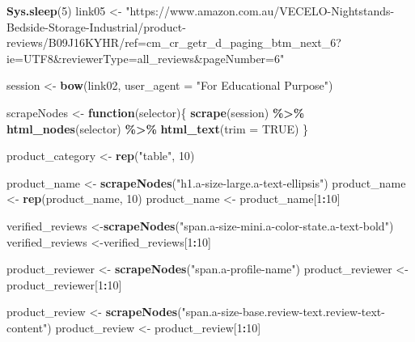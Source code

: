 \documentclass[
]{article}
\newenvironment{Shaded}{\begin{snugshade}}{\end{snugshade}}
\newcommand{\AttributeTok}[1]{\textcolor[rgb]{0.13,0.29,0.53}{#1}}
\newcommand{\ConstantTok}[1]{\textcolor[rgb]{0.56,0.35,0.01}{#1}}
\newcommand{\ControlFlowTok}[1]{\textcolor[rgb]{0.13,0.29,0.53}{\textbf{#1}}}
\newcommand{\DecValTok}[1]{\textcolor[rgb]{0.00,0.00,0.81}{#1}}
\newcommand{\FunctionTok}[1]{\textcolor[rgb]{0.13,0.29,0.53}{\textbf{#1}}}
\newcommand{\NormalTok}[1]{#1}
\newcommand{\OtherTok}[1]{\textcolor[rgb]{0.56,0.35,0.01}{#1}}
\newcommand{\SpecialCharTok}[1]{\textcolor[rgb]{0.81,0.36,0.00}{\textbf{#1}}}
\newcommand{\StringTok}[1]{\textcolor[rgb]{0.31,0.60,0.02}{#1}}
\begin{document}
\begin{Shaded}
\begin{Highlighting}[]
   \FunctionTok{Sys.sleep}\NormalTok{(}\DecValTok{5}\NormalTok{)}
\NormalTok{link05 }\OtherTok{\textless{}{-}} \StringTok{"https://www.amazon.com.au/VECELO{-}Nightstands{-}Bedside{-}Storage{-}Industrial/product{-}reviews/B09J16KYHR/ref=cm\_cr\_getr\_d\_paging\_btm\_next\_6?ie=UTF8\&reviewerType=all\_reviews\&pageNumber=6"}


\NormalTok{  session }\OtherTok{\textless{}{-}} \FunctionTok{bow}\NormalTok{(link02,}
               \AttributeTok{user\_agent =} \StringTok{"For Educational Purpose"}\NormalTok{)}

\NormalTok{  scrapeNodes }\OtherTok{\textless{}{-}} \ControlFlowTok{function}\NormalTok{(selector)\{}
    \FunctionTok{scrape}\NormalTok{(session) }\SpecialCharTok{\%\textgreater{}\%}
      \FunctionTok{html\_nodes}\NormalTok{(selector) }\SpecialCharTok{\%\textgreater{}\%}
      \FunctionTok{html\_text}\NormalTok{(}\AttributeTok{trim =} \ConstantTok{TRUE}\NormalTok{)}
\NormalTok{  \}}

\NormalTok{  product\_category }\OtherTok{\textless{}{-}} \FunctionTok{rep}\NormalTok{(}\StringTok{"table"}\NormalTok{, }\DecValTok{10}\NormalTok{)}

\NormalTok{  product\_name }\OtherTok{\textless{}{-}} \FunctionTok{scrapeNodes}\NormalTok{(}\StringTok{"h1.a{-}size{-}large.a{-}text{-}ellipsis"}\NormalTok{)}
\NormalTok{  product\_name }\OtherTok{\textless{}{-}} \FunctionTok{rep}\NormalTok{(product\_name, }\DecValTok{10}\NormalTok{)}
\NormalTok{  product\_name }\OtherTok{\textless{}{-}}\NormalTok{ product\_name[}\DecValTok{1}\SpecialCharTok{:}\DecValTok{10}\NormalTok{]}
  
\NormalTok{  verified\_reviews }\OtherTok{\textless{}{-}}\FunctionTok{scrapeNodes}\NormalTok{(}\StringTok{"span.a{-}size{-}mini.a{-}color{-}state.a{-}text{-}bold"}\NormalTok{)}
\NormalTok{  verified\_reviews }\OtherTok{\textless{}{-}}\NormalTok{verified\_reviews[}\DecValTok{1}\SpecialCharTok{:}\DecValTok{10}\NormalTok{]}
  
\NormalTok{  product\_reviewer }\OtherTok{\textless{}{-}} \FunctionTok{scrapeNodes}\NormalTok{(}\StringTok{"span.a{-}profile{-}name"}\NormalTok{)}
\NormalTok{  product\_reviewer }\OtherTok{\textless{}{-}}\NormalTok{ product\_reviewer[}\DecValTok{1}\SpecialCharTok{:}\DecValTok{10}\NormalTok{]}
  
\NormalTok{  product\_review }\OtherTok{\textless{}{-}} \FunctionTok{scrapeNodes}\NormalTok{(}\StringTok{"span.a{-}size{-}base.review{-}text.review{-}text{-}content"}\NormalTok{)}
\NormalTok{  product\_review }\OtherTok{\textless{}{-}}\NormalTok{ product\_review[}\DecValTok{1}\SpecialCharTok{:}\DecValTok{10}\NormalTok{]}
  

\end{Highlighting}
\end{Shaded}
\end{document}

